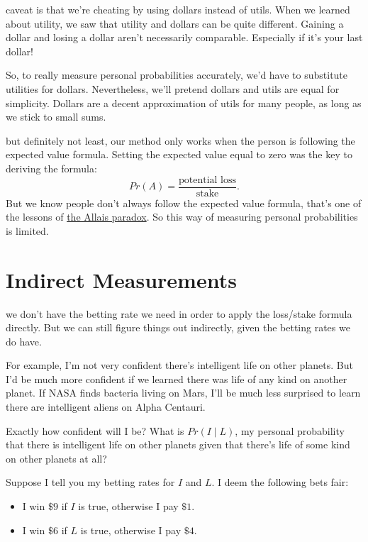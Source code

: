 \documentclass[justified]{tufte-book}
\providecommand{\tightlist}{%
  \setlength{\itemsep}{0pt}\setlength{\parskip}{0pt}}
\newcommand{\given}{\mid}
\newcommand{\p}{Pr}
\theoremstyle{definition}
\theoremstyle{definition}
\theoremstyle{definition}
\theoremstyle{remark}
\begin{document}
 caveat is that we're cheating by using dollars
instead of utils. When we learned about utility, we saw that utility and
dollars can be quite different. Gaining a dollar and losing a dollar
aren't necessarily comparable. Especially if it's your last dollar!

So, to really measure personal probabilities accurately, we'd have to
substitute utilities for dollars. Nevertheless, we'll pretend dollars
and utils are equal for simplicity. Dollars are a decent approximation
of utils for many people, as long as we stick to small sums.

 but definitely not least, our method only works when
the person is following the expected value formula. Setting the expected
value equal to zero was the key to deriving the formula:
\[ \p(A) = \frac{\mbox{potential loss}}{\mbox{stake}}. \] But we know
people don't always follow the expected value formula, that's one of the
lessons of \protect\hyperlink{the-allais-paradox}{the Allais paradox}.
So this way of measuring personal probabilities is limited.

\hypertarget{indirect-measurements}{%
\section{Indirect Measurements}\label{indirect-measurements}}

 we don't have the betting rate we need in order
to apply the loss/stake formula directly. But we can still figure things
out indirectly, given the betting rates we do have.

For example, I'm not very confident there's intelligent life on other
planets. But I'd be much more confident if we learned there was life of
any kind on another planet. If NASA finds bacteria living on Mars, I'll
be much less surprised to learn there are intelligent aliens on Alpha
Centauri.

Exactly how confident will I be? What is \(\p(I \given L)\), my personal
probability that there is intelligent life on other planets given that
there's life of some kind on other planets at all?

Suppose I tell you my betting rates for \(I\) and \(L\). I deem the
following bets fair:

\begin{itemize}
\tightlist
\item
  I win \(\$9\) if \(I\) is true, otherwise I pay \(\$1\).
\item
  I win \(\$6\) if \(L\) is true, otherwise I pay \(\$4\).
\end{itemize}
\end{document}
